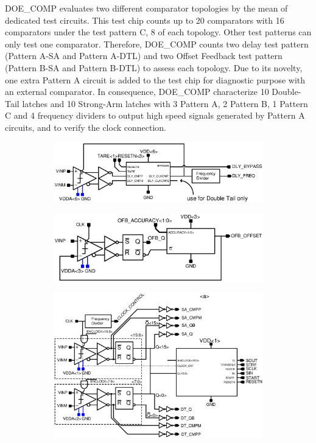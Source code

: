 DOE\_COMP evaluates two different comparator topologies by the mean of dedicated test circuits. This test chip counts up to 20 comparators with 16 comparators under the test pattern C, 8 of each topology. Other test patterns can only test one comparator. Therefore, DOE\_COMP counts two delay test pattern (Pattern A-SA and Pattern A-DTL) and two Offset Feedback test pattern (Pattern B-SA and Pattern B-DTL) to assess each topology. Due to its novelty, one extra Pattern A circuit is added to the test chip for diagnostic purpose with an external comparator. In consequence, DOE\_COMP characterize 10 Double-Tail latches and 10 Strong-Arm latches with 3 Pattern A, 2 Pattern B, 1 Pattern C and 4 frequency dividers to output high speed signals generated by Pattern A circuits, and to verify the clock connection. 

\begin{figure}[htp]
    \centering
    \begin{subfigure}[b]{0.5\textwidth}
        \includegraphics[width=\textwidth]{Chapter5/Figs/comp_test/test_delay_bloc_close_sa.ps}
    \end{subfigure}
    \begin{subfigure}[b]{0.5\textwidth}
        \includegraphics[width=\textwidth]{Chapter5/Figs/comp_test/test_offset_bloc_close_sa.ps}
    \end{subfigure}
    \begin{subfigure}[b]{0.75\textwidth}
        \includegraphics[width=\textwidth]{Chapter5/Figs/comp_test/test_offset_conv_bloc.ps}

\end{subfigure}
\end{figure}
